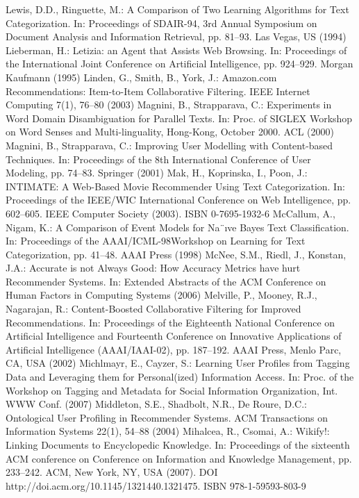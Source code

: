 \begin{thebibliography}{110}
Lewis, D.D., Ringuette, M.: A Comparison of Two Learning Algorithms for Text Categorization. In: Proceedings of SDAIR-94, 3rd Annual Symposium on Document Analysis and Information Retrieval, pp. 81–93. Las Vegas, US (1994)
Lieberman, H.: Letizia: an Agent that Assists Web Browsing. In: Proceedings of the International Joint Conference on Artificial Intelligence, pp. 924–929. Morgan Kaufmann (1995)
Linden, G., Smith, B., York, J.: Amazon.com Recommendations: Item-to-Item Collaborative Filtering. IEEE Internet Computing 7(1), 76–80 (2003)
Magnini, B., Strapparava, C.: Experiments in Word Domain Disambiguation for Parallel Texts. In: Proc. of SIGLEX Workshop on Word Senses and Multi-linguality, Hong-Kong, October 2000. ACL (2000)
Magnini, B., Strapparava, C.: Improving User Modelling with Content-based Techniques. In: Proceedings of the 8th International Conference of User Modeling, pp. 74–83. Springer (2001)
Mak, H., Koprinska, I., Poon, J.: INTIMATE: A Web-Based Movie Recommender Using Text Categorization. In: Proceedings of the IEEE/WIC International Conference on Web Intelligence, pp. 602–605. IEEE Computer Society (2003). ISBN 0-7695-1932-6
McCallum, A., Nigam, K.: A Comparison of Event Models for Na¨ıve Bayes Text Classification. In: Proceedings of the AAAI/ICML-98Workshop on Learning for Text Categorization, pp. 41–48. AAAI Press (1998)
McNee, S.M., Riedl, J., Konstan, J.A.: Accurate is not Always Good: How Accuracy Metrics have hurt Recommender Systems. In: Extended Abstracts of the ACM Conference on Human Factors in Computing Systems (2006)
Melville, P., Mooney, R.J., Nagarajan, R.: Content-Boosted Collaborative Filtering for Improved Recommendations. In: Proceedings of the Eighteenth National Conference on Artificial Intelligence and Fourteenth Conference on Innovative Applications of Artificial Intelligence (AAAI/IAAI-02), pp. 187–192. AAAI Press, Menlo Parc, CA, USA (2002)
Michlmayr, E., Cayzer, S.: Learning User Profiles from Tagging Data and Leveraging them for Personal(ized) Information Access. In: Proc. of the Workshop on Tagging and Metadata for Social Information Organization, Int. WWW Conf. (2007)
Middleton, S.E., Shadbolt, N.R., De Roure, D.C.: Ontological User Profiling in Recommender Systems. ACM Transactions on Information Systems 22(1), 54–88 (2004)
Mihalcea, R., Csomai, A.: Wikify!: Linking Documents to Encyclopedic Knowledge. In: Proceedings of the sixteenth ACM conference on Conference on Information and Knowledge Management, pp. 233–242. ACM, New York, NY, USA (2007). DOI http://doi.acm.org/10.1145/1321440.1321475. ISBN 978-1-59593-803-9

\end{thebibliography}
